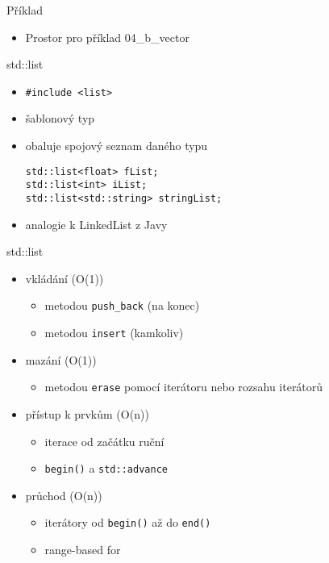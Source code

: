 \documentclass{beamer}
\begin{document}
\begin{xframe}{Příklad}
	\begin{itemize}
		\item Prostor pro příklad 04\_b\_vector
	\end{itemize}
\end{xframe}


\begin{xframe}{std::list}
	\begin{itemize}
		\item \texttt{\#include <list>}
		\item šablonový typ
		\item obaluje spojový seznam daného typu
\begin{lstlisting}[basicstyle=\fontsize{8}{9}\selectfont\ttfamily]
std::list<float> fList;
std::list<int> iList;
std::list<std::string> stringList;
\end{lstlisting}
		\item analogie k LinkedList z Javy
	\end{itemize}
\end{xframe}

\begin{xframe}{std::list}
	\begin{itemize}
		\item vkládání (O(1))
			\begin{itemize}
				\item metodou \texttt{push\_back} (na konec)
				\item metodou \texttt{insert} (kamkoliv)
			\end{itemize}
		\item mazání (O(1))
			\begin{itemize}
				\item metodou \texttt{erase} pomocí iterátoru nebo rozsahu iterátorů
			\end{itemize}
		\item přístup k prvkům (O(n))
			\begin{itemize}
				\item iterace od začátku ruční
				\item \texttt{begin()} a \texttt{std::advance}
			\end{itemize}
		\item průchod (O(n))
			\begin{itemize}
				\item iterátory od \texttt{begin()} až do \texttt{end()}
				\item range-based for
			\end{itemize}
	\end{itemize}
\end{xframe}
\end{document}

